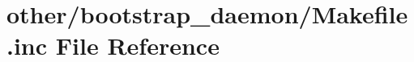 \hypertarget{other_2bootstrap__daemon_2_makefile_8inc}{\section{other/bootstrap\+\_\+daemon/\+Makefile.inc File Reference}
\label{other_2bootstrap__daemon_2_makefile_8inc}
}
